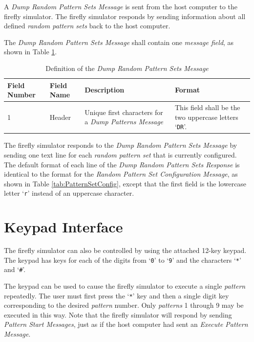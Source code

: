 \documentclass[letterpaper,11pt]{article}
\begin{document}
A \textit{Dump Random Pattern Sets Message} is sent from the host computer to
the firefly simulator. The firefly simulator responds by sending information
about all defined \textit{random pattern sets} back to the host computer.

The \textit{Dump Random Pattern Sets Message} shall contain one
\textit{message field}, as shown in Table \ref{tab:DumpPatternSets}.

\begin{table}[H]
  \caption{Definition of the \textit{Dump Random Pattern Sets Message}}
  \centering
  \setlength\extrarowheight{2pt}
  \begin{tabular}[h]{|p{0.5in}|p{1.00in}|p{2.25in}|p{2.25in}|} \hline
    Field Number & Field Name & Description & Format \\ \hline
    1            & Header
    & Unique first characters for a \textit{Dump Patterns Message}
    & This field shall be the two uppercase letters `\texttt{DR}'.
    \\ \hline
  \end{tabular}
  \label{tab:DumpPatternSets}
\end{table}

The firefly simulator responds to the \textit{Dump Random Pattern Sets
Message} by sending one text line for each \textit{random pattern set} that
is currently configured. The default format of each line of the
\textit{Dump Random Pattern Sets Response} is identical to the format for the
\textit{Random Pattern Set Configuration Message}, as shown in Table
\ref{tab:PatternSetConfig}, except that the first field is the lowercase
letter `\texttt{r}' instead of an uppercase character.

\section{Keypad Interface}

The firefly simulator can also be controlled by using the attached 12-key
keypad. The keypad has keys for each of the digits from `\texttt{0}' to 
`\texttt{9}' and the characters `\texttt{*}' and `\texttt{\#}'.

The keypad can be used to cause the firefly simulator to execute a single
\textit{pattern} repeatedly. The user must first press the `\texttt{*}' key and
then a single digit key corresponding to the desired \textit{pattern} number.
Only \textit{patterns} 1 through 9 may be executed in this way. Note that the
firefly simulator will respond by sending \textit{Pattern Start Messages},
just as if the host computer had sent an \textit{Execute Pattern Message}.
\end{document}
